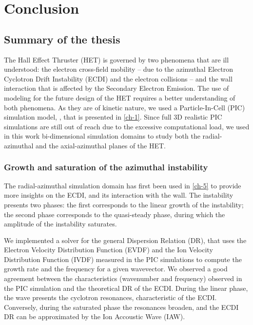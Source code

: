 
\chapter{Conclusion}
\label{ch-conclusion}


\section{Summary of the thesis}

  The Hall Effect Thruster (HET) is governed by two phenomena that are ill understood\string: the electron cross-field mobility -- due to the azimuthal Electron Cyclotron Drift Instability (ECDI) and the electron collisions -- and the wall interaction that is affected by the Secondary Electron Emission.
  The use of modeling for the future design  of the HET requires a better understanding of both phenomena. 
  As they are of kinetic nature, we used a Particle-In-Cell (PIC) simulation model, \LPPic, that is presented in \cref{ch-1}.
  Since full 3D realistic PIC simulations are still out of reach due to the excessive computational load, we used in this work bi-dimensional simulation domains to study both the radial-azimuthal and the axial-azimuthal planes of the HET.

  \subsection{Growth and saturation of the azimuthal instability}

    The radial-azimuthal simulation domain has first been used in \cref{ch-5} to provide more insights on the \ac{ECDI}, and its interaction with the wall.
    The instability presents two phases\string: the first corresponds to the linear growth of the instability; the second phase corresponds to the quasi-steady phase, during which the amplitude of the instability saturates.

    We implemented a solver for the general Dispersion Relation (DR), that uses the Electron Velocity Distribution Function (EVDF) and the Ion Velocity Distribution Function (IVDF) measured in the PIC simulations to compute the growth rate and the frequency for a given wavevector.
    We observed a good agreement between the characteristics (wavenumber and frequency) observed in the \ac{PIC} simulation and the theoretical DR of the ECDI.
    During the linear phase, the wave presents the cyclotron resonances, characteristic of the ECDI.
    Conversely, during the saturated phase the resonances broaden, and the ECDI DR can be approximated by the Ion Accoustic Wave (IAW).

